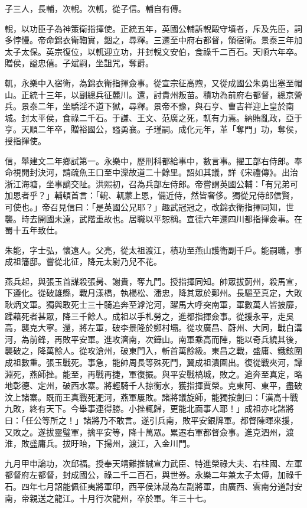 \begin{pinyinscope}
子三人，長輔，次輗。次軏，從子信。輔自有傳。

輗，以功臣子為神策衛指揮使。正統五年，英國公輔訴輗毆守墳者，斥及先臣，詞多悖慢。帝命錦衣衛鞫實，錮之，尋釋。三遷至中府右都督，領宿衛。景泰三年加太子太保。英宗復位，以軏迎立功，并封輗文安伯，食祿千二百石。天順六年卒。贈侯，謚忠僖。子斌嗣，坐詛咒，奪爵。

軏，永樂中入宿衛，為錦衣衛指揮僉事。從宣宗征高煦，又從成國公朱勇出塞至帽山。正統十三年，以副總兵征麓川。還，討貴州叛苗。積功為前府右都督，總京營兵。景泰二年，坐驕淫不道下獄，尋釋。景帝不豫，與石亨、曹吉祥迎上皇於南城。封太平侯，食祿二千石。于謙、王文、范廣之死，軏有力焉。納賄亂政，亞于亨。天順二年卒，贈裕國公，謚勇襄。子瑾嗣。成化元年，革「奪門」功，奪侯，授指揮使。

信，舉建文二年鄉試第一。永樂中，歷刑科都給事中，數言事。擢工部右侍郎。奉命視開封決河，請疏魚王口至中灤故道二十餘里。詔如其議，詳《宋禮傳》。出治浙江海塘，坐事謫交阯。洪熙初，召為兵部左侍郎。帝嘗謂英國公輔：「有兄弟可加恩者乎？」輔頓首言：「輗、軏蒙上恩，備近侍，然皆奢侈。獨從兄侍郎信賢，可使也。」帝召見信曰：「是英國公兄耶？」趣武冠冠之，改錦衣衛指揮同知，世襲。時去開國未遠，武階重故也。居職以平恕稱。宣德六年遷四川都指揮僉事。在蜀十五年致仕。

朱能，字士弘，懷遠人。父亮，從太祖渡江，積功至燕山護衛副千戶。能嗣職，事成祖籓邸。嘗從北征，降元太尉乃兒不花。

燕兵起，與張玉首謀殺張昺、謝貴，奪九門。授指揮同知。帥眾拔薊州，殺馬宣，下遵化。從破雄縣，戰月漾橋，執楊松、潘忠，降其眾於鄚州。長驅至真定，大敗耿炳文軍。獨與敢死士三十騎追奔至滹沱河，躍馬大呼突南軍，軍數萬人皆披靡，蹂藉死者甚眾，降三千餘人。成祖以手札勞之，進都指揮僉事。從援永平，走吳高，襲克大寧。還，將左軍，破李景隆於鄭村壩。從攻廣昌、蔚州、大同，戰白溝河，為前鋒，再敗平安軍。進攻濟南，次鏵山。南軍乘高而陣，能以奇兵繞其後，襲破之，降萬餘人。從攻滄州，破東門入，斬首萬餘級。東昌之戰，盛庸、鐵鉉圍成祖數重。張玉戰死。事急，能帥周長等殊死鬥，翼成祖潰圍出。復從戰夾河，譚淵死，燕師挫。能至，再戰再捷，軍復振。與平安戰槁城，敗之。追奔至真定，略地彰德、定州，破西水寨。將輕騎千人掠衡水，獲指揮賈榮。克東阿、東平，盡破汶上諸寨。既而王真戰死淝河，燕軍屢敗。諸將議旋師，能獨按劍曰：「漢高十戰九敗，終有天下。今舉事連得勝。小挫輒歸，更能北面事人耶！」成祖亦叱諸將曰：「任公等所之！」諸將乃不敢言。遂引兵南，敗平安銀牌軍。都督陳暉來援，又敗之。遂拔靈璧軍，擒平安等，降十萬眾。累遷右軍都督僉事。進克泗州，渡淮，敗盛庸兵。拔盱眙，下揚州，渡江，入金川門。

九月甲申論功，次邱福。授奉天靖難推誠宣力武臣、特進榮祿大夫、右柱國、左軍都督府左都督，封成國公，祿二千二百石，與世券。永樂二年兼太子太傅，加祿千石。四年七月詔能佩征夷將軍印，西平侯沐晟為左副將軍，由廣西、雲南分道討安南，帝親送之龍江。十月行次龍州，卒於軍。年三十七。


\end{pinyinscope}
